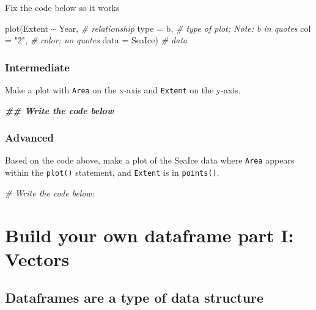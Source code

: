 \documentclass[
]{book}
\newenvironment{Shaded}{\begin{snugshade}}{\end{snugshade}}
\newcommand{\AttributeTok}[1]{\textcolor[rgb]{0.77,0.63,0.00}{#1}}
\newcommand{\CommentTok}[1]{\textcolor[rgb]{0.56,0.35,0.01}{\textit{#1}}}
\newcommand{\DocumentationTok}[1]{\textcolor[rgb]{0.56,0.35,0.01}{\textbf{\textit{#1}}}}
\newcommand{\FunctionTok}[1]{\textcolor[rgb]{0.00,0.00,0.00}{#1}}
\newcommand{\NormalTok}[1]{#1}
\newcommand{\SpecialCharTok}[1]{\textcolor[rgb]{0.00,0.00,0.00}{#1}}
\newcommand{\StringTok}[1]{\textcolor[rgb]{0.31,0.60,0.02}{#1}}
\begin{document}
Fix the code below so it works

\begin{Shaded}
\begin{Highlighting}[]
\FunctionTok{plot}\NormalTok{(Extent }\SpecialCharTok{\textasciitilde{}}\NormalTok{ Year,  }\CommentTok{\# relationship}
     \AttributeTok{type =}\NormalTok{ b,     }\CommentTok{\# type of plot; Note: b in quotes}
     \AttributeTok{col =} \StringTok{"2"}\NormalTok{,        }\CommentTok{\# color; no quotes}
     \AttributeTok{data =}\NormalTok{ SeaIce)  }\CommentTok{\# data}
\end{Highlighting}
\end{Shaded}

\hypertarget{intermediate}{%
\subsection{Intermediate}\label{intermediate}}

Make a plot with \texttt{Area} on the x-axis and \texttt{Extent} on the y-axis.

\begin{Shaded}
\begin{Highlighting}[]
\DocumentationTok{\#\# Write the code below}
\end{Highlighting}
\end{Shaded}

\hypertarget{advanced}{%
\subsection{Advanced}\label{advanced}}

Based on the code above, make a plot of the SeaIce data where \texttt{Area} appears within the \texttt{plot()} statement, and \texttt{Extent} is in \texttt{points()}.

\begin{Shaded}
\begin{Highlighting}[]
\CommentTok{\# Write the code below: }
\end{Highlighting}
\end{Shaded}

\hypertarget{build-your-own-dataframe-part-i-vectors}{%
\chapter{Build your own dataframe part I: Vectors}\label{build-your-own-dataframe-part-i-vectors}}

\hypertarget{dataframes-are-a-type-of-data-structure}{%
\section{Dataframes are a type of data structure}\label{dataframes-are-a-type-of-data-structure}}
\end{document}
